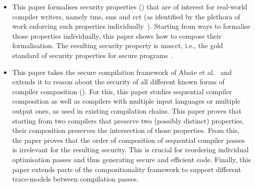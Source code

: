 \documentclass[dvipsnames]{llncs}
\begin{document}
\begin{itemize}
  \item %
        This paper formalises security properties () that are of interest for real-world compiler writers, namely \gls*{tms}, \gls*{sms} and \gls*{cct} (as identified by the plethora of work enforcing such properties individually~\cite{akritidis2009baggy,nagarakatte2009soft,nagarakatte2010cets,dhumbumroong2020boundwarden,jung2021pico,nam2019framer,shankaranarayana2023tailcheck,younan2010paricheck,zhou2023fatptrs,bond2017vale,almeida2017jasmin,kuepper2023cryptopt,cauligi2019fact}).
        Starting from ways to formalise those properties individually, this paper shows how to compose their formalisation.
        The resulting security property is \gls*{msscct}, i.e., the gold standard of security properties for secure programs~\cite{lemay2021ccc}.


  \item %
        This paper takes the secure compilation framework of Abate et al.~\cite{abate2019jour} and extends it to reason about the security of all different known forms of compiler composition ().
        For this, this paper studies sequential compiler composition as well as compilers with multiple input languages or multiple output ones, as used in existing compilation chains.
        This paper proves that starting from two compilers that preserve two (possibly distinct) properties, their composition preserves the intersection of those properties.
        From this, the paper proves that the order of composition of sequential compiler passes is irrelevant for the resulting security.
        This is crucial for reordering individual optimisation passes and thus generating secure and efficient code.
        Finally, this paper extends parts of the compositionality framework to support different trace-models between compilation passes.


\end{itemize}
\end{document}
